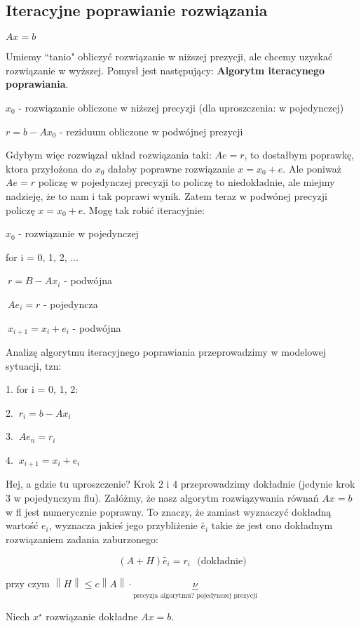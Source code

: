 \documentclass[hidelinks,a4paper,fleqn]{article}
\newcommand{\norm}[1]{\left\lVert#1\right\rVert}
\begin{document}
\subsection{Iteracyjne poprawianie rozwiązania}

$Ax = b$

Umiemy ``tanio" obliczyć rozwiązanie w niższej prezycji, ale chcemy uzyskać rozwiązanie w wyższej. Pomysł jest następujący: \textbf{Algorytm iteracynego poprawiania}.

$x_0$ - rozwiązanie obliczone w niższej precyzji (dla uproszczenia: w pojedynczej)

$r = b-Ax_0$ - reziduum obliczone w podwójnej prezycji

Gdybym więc rozwiązał układ rozwiązania taki: $Ae = r$, to dostałbym poprawkę, ktora przyłożona do $x_0$ dałaby poprawne rozwiązanie $x = x_0 + e$. Ale poniważ $Ae = r$ policzę w pojedynczej precyzji to policzę to niedokładnie, ale miejmy nadzieję, że to nam i tak poprawi wynik. Zatem teraz w podwónej precyzji policzę $x = x_0 + e$. Mogę tak robić iteracyjnie:

$x_0$ - rozwiązanie w pojedynczej

for i = 0, 1, 2, ...

$\ r = B-Ax_i$ - podwójna

$\ Ae_i = r$ - pojedyncza

$\ x_{i+1} = x_i + e_i$ - podwójna
	


Analizę algorytmu iteracyjnego poprawiania przeprowadzimy w modelowej sytuacji, tzn:

1. for i = 0, 1, 2:

2. $\ r_i = b - Ax_i$

3. $\ Ae_n = r_i$

4. $\ x_{i+1} = x_i + e_i$
	
Hej, a gdzie tu uproszczenie? Krok 2 i 4 przeprowadzimy dokładnie (jedynie krok 3 w pojedynczym flu). Załóżmy, że nasz algorytm rozwiązywania równań $Ax = b$ w fl jest numerycznie poprawny. To znaczy, że zamiast wyznaczyć dokładną wartość $e_i$, wyznacza jakieś jego przybliżenie $\tilde{e_i}$ takie że jest ono dokładnym rozwiązaniem zadania zaburzonego:

\[
	(A + H)\tilde{e_i} = r_i \ \ \ \textrm{(dokładnie)}
\]

przy czym $\norm{H} \leq c \norm{A} \cdot \underbrace{\nu}_{\textrm{precyzja algorytmu? pojedynczej prezycji}}$

Niech $x^\star$ rozwiązanie dokładne $Ax = b$.
\end{document}
